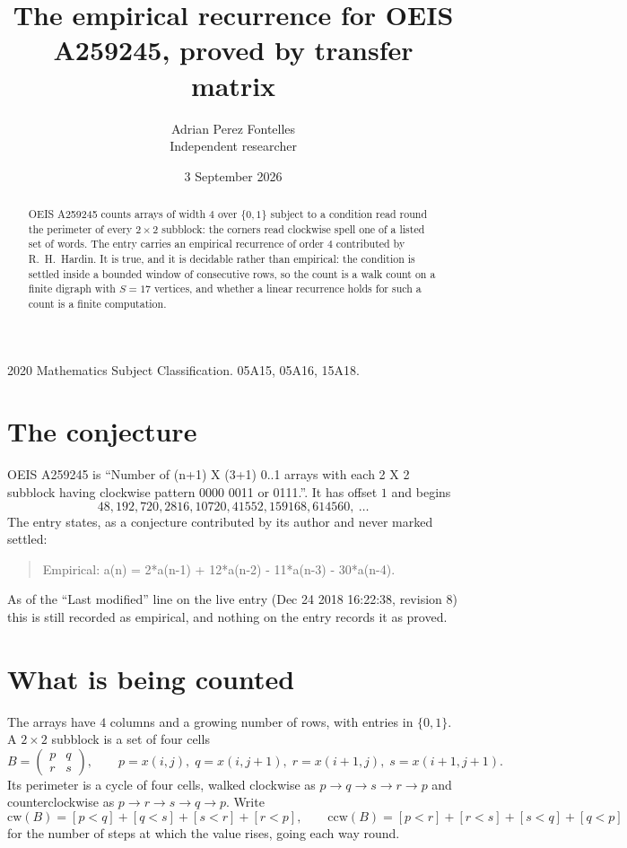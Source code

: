 \documentclass[11pt,a4paper]{article}
\title{The empirical recurrence for OEIS A259245, proved by transfer matrix}
\author{Adrian Perez Fontelles\\ \small Independent researcher}
\date{3 September 2026}
\theoremstyle{plain}
\theoremstyle{definition}
\begin{document}
\maketitle

\begin{abstract}
OEIS A259245 counts arrays of width $4$ over $\{0,1\}$ subject to a condition read round the
perimeter of every $2\times2$ subblock: the corners read clockwise spell one of a listed set of words. The entry carries an empirical recurrence of
order $4$ contributed by R.~H.~Hardin. It is true, and it is decidable rather than
empirical: the condition is settled inside a bounded window of consecutive rows, so the
count is a walk count on a finite digraph with $S=17$ vertices, and whether a linear
recurrence holds for such a count is a finite computation.
\end{abstract}

\noindent\small 2020 Mathematics Subject Classification. 05A15, 05A16, 15A18.\normalsize

\section{The conjecture}

OEIS A259245 is ``Number of (n+1) X (3+1) 0..1 arrays with each 2 X 2 subblock having clockwise pattern 0000 0011 or 0111.''. It has offset $1$ and begins
\[
48, 192, 720, 2816, 10720, 41552, 159168, 614560,\ \dots
\]
The entry states, as a conjecture contributed by its author and never marked settled:
\begin{quote}
Empirical: a(n) = 2*a(n-1) + 12*a(n-2) - 11*a(n-3) - 30*a(n-4).
\end{quote}
As of the ``Last modified'' line on the live entry (Dec 24 2018 16:22:38, revision 8) this is still
recorded as empirical, and nothing on the entry records it as proved.

\section{What is being counted}

The arrays have $4$ columns and a growing number of rows, with entries in $\{0,1\}$. A
$2\times2$ subblock is a set of four cells
\[
B=\begin{pmatrix} p & q \\ r & s \end{pmatrix},
\qquad p=x(i,j),\; q=x(i,j+1),\; r=x(i+1,j),\; s=x(i+1,j+1).
\]
Its perimeter is a cycle of four cells, walked clockwise as $p\to q\to s\to r\to p$ and
counterclockwise as $p\to r\to s\to q\to p$. Write
\[
\mathrm{cw}(B)=[p<q]+[q<s]+[s<r]+[r<p],\qquad
\mathrm{ccw}(B)=[p<r]+[r<s]+[s<q]+[q<p]
\]
for the number of steps at which the value rises, going each way round.
\end{document}
